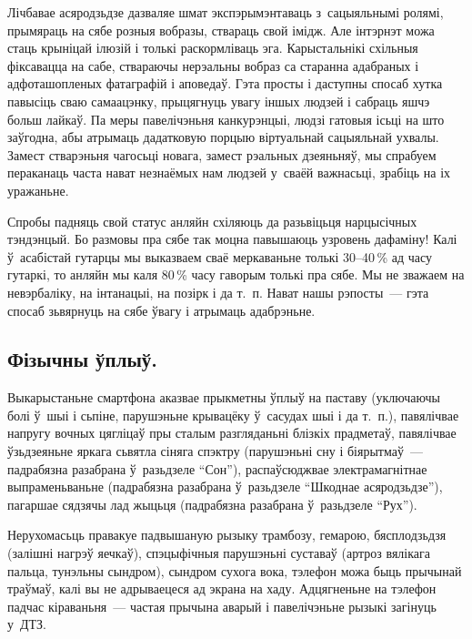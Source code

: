 Лічбавае асяродзьдзе дазваляе шмат экспэрымэнтаваць з~сацыяльнымі ролямі, прымяраць на сябе розныя вобразы, ствараць свой імідж. Але інтэрнэт можа стаць крыніцай ілюзій і толькі раскормліваць эга. Карыстальнікі схільныя фіксавацца на сабе, ствараючы нерэальны вобраз са старанна адабраных і адфоташопленых фатаграфій і аповедаў. Гэта просты і даступны спосаб хутка павысіць сваю самаацэнку, прыцягнуць увагу іншых людзей і сабраць яшчэ больш лайкаў. Па меры павелічэньня канкурэнцыі, людзі гатовыя ісьці на што заўгодна, абы атрымаць дадатковую порцыю віртуальнай сацыяльнай ухвалы. Замест стварэньня чагосьці новага, замест рэальных дзеяньняў, мы спрабуем пераканаць часта нават незнаёмых нам людзей у~сваёй важнасьці, зрабіць на іх уражаньне.

Спробы падняць свой статус анляйн схіляюць да разьвіцьця нарцысічных тэндэнцый. Бо размовы пра сябе так моцна павышаюць узровень дафаміну! Калі ў~асабістай гутарцы мы выказваем сваё меркаваньне толькі 30--40\,\% ад часу гутаркі, то анляйн мы каля 80\,\% часу гаворым толькі пра сябе. Мы не зважаем на невэрбаліку, на інтанацыі, на позірк і да т.~п. Нават нашы рэпосты~--- гэта спосаб зьвярнуць на сябе ўвагу і атрымаць адабрэньне.

\subsection*{Фізычны ўплыў.}

Выкарыстаньне смартфона аказвае прыкметны ўплыў на паставу (уключаючы болі ў~шыі і сьпіне, парушэньне крывацёку ў~сасудах шыі і да т.~п.), павялічвае напругу вочных цягліцаў пры сталым разгляданьні блізкіх прадметаў, павялічвае ўзьдзеяньне яркага сьвятла сіняга спэктру (парушэньні сну і біярытмаў~--- падрабязна разабрана ў~разьдзеле ``Сон''), распаўсюджвае электрамагнітнае выпраменьваньне (падрабязна разабрана ў~разьдзеле ``Шкоднае асяродзьдзе''), пагаршае сядзячы лад жыцьця (падрабязна разабрана ў~разьдзеле ``Рух'').

Нерухомасьць правакуе падвышаную рызыку трамбозу, гемарою, бясплодзьдзя (залішні нагрэў яечкаў), спэцыфічныя парушэньні суставаў (артроз вялікага пальца, тунэльны сындром), сындром сухога вока, тэлефон можа быць прычынай траўмаў, калі вы не адрываецеся ад экрана на хаду. Адцягненьне на тэлефон падчас кіраваньня~--- частая прычына аварый і павелічэньне рызыкі загінуць у~ДТЗ.


